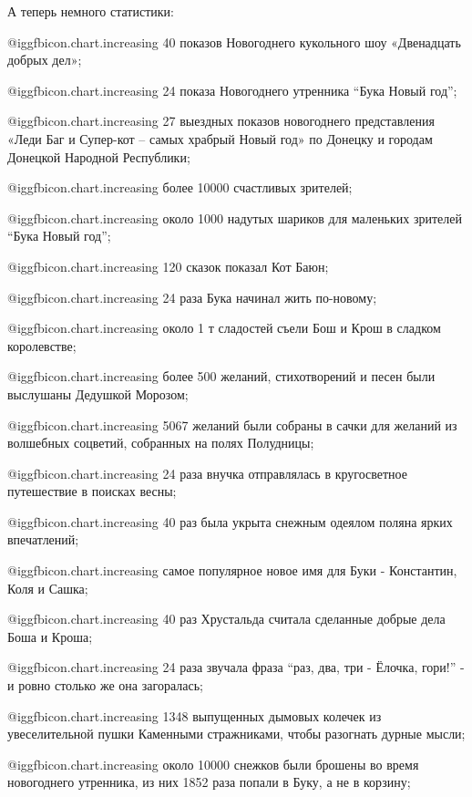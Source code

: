 А теперь немного статистики:

 @igg{fbicon.chart.increasing}  40 показов Новогоднего кукольного шоу «Двенадцать добрых дел»;

 @igg{fbicon.chart.increasing}  24 показа Новогоднего утренника \enquote{Бука Новый год};

 @igg{fbicon.chart.increasing}  27 выездных показов новогоднего представления «Леди Баг и Супер-кот – самых
храбрый Новый год» по Донецку и городам Донецкой Народной Республики;

 @igg{fbicon.chart.increasing}  более 10000 счастливых зрителей;

 @igg{fbicon.chart.increasing}  около 1000 надутых шариков для маленьких зрителей \enquote{Бука Новый год};

 @igg{fbicon.chart.increasing}  120 сказок показал Кот Баюн;

 @igg{fbicon.chart.increasing}  24 раза Бука начинал жить по-новому;

 @igg{fbicon.chart.increasing}  около 1 т сладостей съели Бош и Крош в сладком королевстве;


 @igg{fbicon.chart.increasing}  более 500 желаний, стихотворений и песен были выслушаны Дедушкой Морозом;

 @igg{fbicon.chart.increasing}  5067 желаний были собраны в сачки для желаний из волшебных соцветий,
собранных на полях Полудницы;

 @igg{fbicon.chart.increasing}  24 раза внучка отправлялась в кругосветное путешествие в поисках весны;

 @igg{fbicon.chart.increasing}  40 раз была укрыта снежным одеялом поляна ярких впечатлений;

 @igg{fbicon.chart.increasing}  самое популярное новое имя для Буки - Константин, Коля и Сашка;

 @igg{fbicon.chart.increasing}  40 раз Хрустальда считала сделанные добрые дела Боша и Кроша;

 @igg{fbicon.chart.increasing}  24 раза звучала фраза \enquote{раз, два, три - Ёлочка, гори!} - и ровно столько же
она загоралась;

 @igg{fbicon.chart.increasing}  1348 выпущенных дымовых колечек из увеселительной пушки Каменными
стражниками, чтобы разогнать дурные мысли;

 @igg{fbicon.chart.increasing}  около 10000 снежков были брошены во время новогоднего утренника, из них 1852
раза попали в Буку, а не в корзину;

